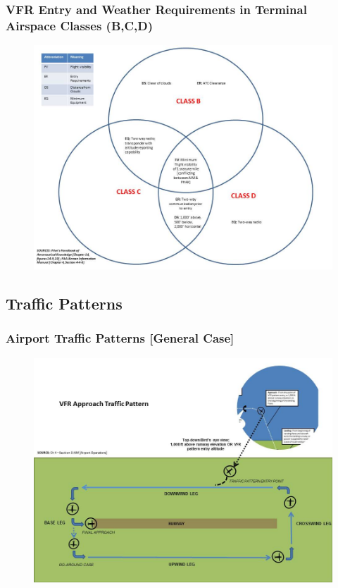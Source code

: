\documentclass{article}
\begin{document}
\subsubsection*{VFR Entry and Weather Requirements in Terminal Airspace Classes (B,C,D)}

\begin{figure}[H]
\centering
\includegraphics[scale=0.5]{VFR_Weather_minimums.jpg} 
\end{figure}

\subsection{Traffic Patterns}


\subsubsection*{Airport Traffic Patterns [General Case]}


\begin{figure}[H]
\centering
\includegraphics[scale=0.5]{final_approach_traffic_pattern.jpg} 
\end{figure}
\end{document}
